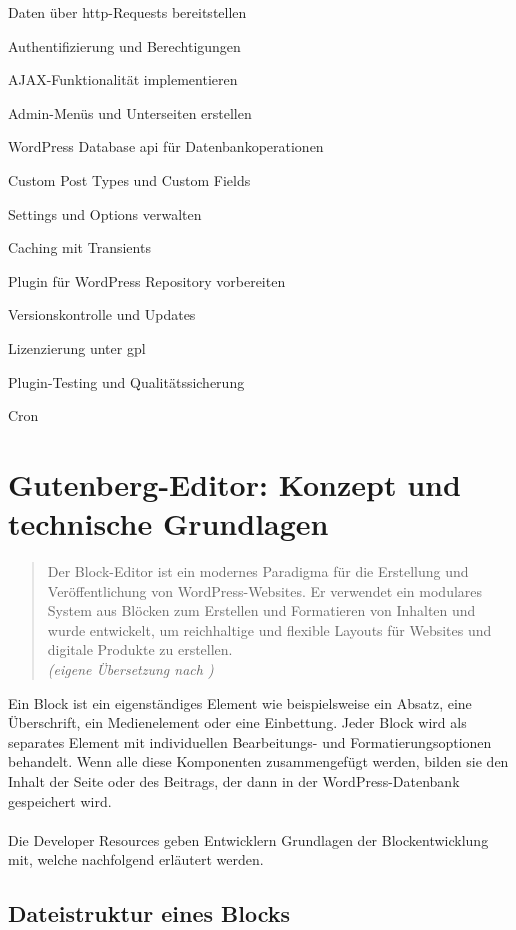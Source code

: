 Daten über \gls{http}-Requests bereitstellen

Authentifizierung und Berechtigungen

AJAX-Funktionalität implementieren

Admin-Menüs und Unterseiten erstellen

WordPress Database \gls{api} für Datenbankoperationen

Custom Post Types und Custom Fields

Settings und Options verwalten

Caching mit Transients

Plugin für WordPress Repository vorbereiten

Versionskontrolle und Updates

Lizenzierung unter \gls{gpl}

Plugin-Testing und Qualitätssicherung

Cron

\section{Gutenberg-Editor: Konzept und technische Grundlagen}
\begin{quote}
    Der Block-Editor ist ein modernes Paradigma für die Erstellung und Veröffentlichung von WordPress-Websites.
    Er verwendet ein modulares System aus Blöcken zum Erstellen und Formatieren von Inhalten und wurde entwickelt,
    um reichhaltige und flexible Layouts für Websites und digitale Produkte zu erstellen.
    \\[0.5em]
    \emph{(eigene Übersetzung nach \cite{wordpress2024plugin_blockeditor})}
\end{quote}



Ein Block ist ein eigenständiges Element wie beispielsweise ein Absatz, eine Überschrift, ein Medienelement oder eine Einbettung.
Jeder Block wird als separates Element mit individuellen Bearbeitungs- und Formatierungsoptionen behandelt.
Wenn alle diese Komponenten zusammengefügt werden, bilden sie den Inhalt der Seite oder des Beitrags, der dann in der WordPress-Datenbank gespeichert wird.
\\\\
Die Developer Resources geben Entwicklern Grundlagen der Blockentwicklung mit, welche nachfolgend erläutert werden.

\subsection{Dateistruktur eines Blocks}

